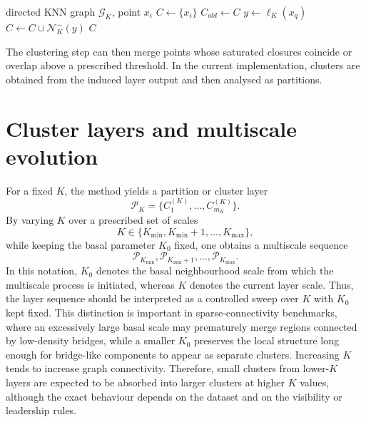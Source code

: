 \documentclass[pdflatex,sn-mathphys-num]{sn-jnl}
\newcommand{\calG}{\mathcal{G}}
\newcommand{\calN}{\mathcal{N}}
\newcommand{\calP}{\mathcal{P}}
\begin{document}
\begin{algorithm}[t]
\caption{Leadership-driven round-trip closure for one point}
\label{alg:closure}
\begin{algorithmic}[1]
\Require directed KNN graph $\calG_K$, point $x_i$
\State $C \gets \{x_i\}$
\Repeat
    \State $C_{old}\gets C$
        \State $y\gets \ell_K(x_q)$
        \State $C\gets C\cup\calN_K^-(y)$
    \EndFor
{}
\State \Return $C$
\end{algorithmic}
\end{algorithm}

The clustering step can then merge points whose saturated closures coincide or overlap above a prescribed threshold. In the current implementation, clusters are obtained from the induced layer output and then analysed as partitions.

\section{Cluster layers and multiscale evolution}\label{sec:layers}

For a fixed $K$, the method yields a partition or cluster layer
\begin{equation}
\calP_K=\{C_1^{(K)},\ldots,C_{m_K}^{(K)}\}.
\end{equation}
By varying $K$ over a prescribed set of scales
\begin{equation}
K\in\{K_{\min},K_{\min}+1,\ldots,K_{\max}\},
\end{equation}
while keeping the basal parameter $K_0$ fixed, one obtains a multiscale sequence
\begin{equation}
\calP_{K_{\min}},\calP_{K_{\min}+1},\ldots,\calP_{K_{\max}}.
\end{equation}
In this notation, $K_0$ denotes the basal neighbourhood scale from which the multiscale process is initiated, whereas $K$ denotes the current layer scale. Thus, the layer sequence should be interpreted as a controlled sweep over $K$ with $K_0$ kept fixed. This distinction is important in sparse-connectivity benchmarks, where an excessively large basal scale may prematurely merge regions connected by low-density bridges, while a smaller $K_0$ preserves the local structure long enough for bridge-like components to appear as separate clusters.
Increasing $K$ tends to increase graph connectivity. Therefore, small clusters from lower-$K$ layers are expected to be absorbed into larger clusters at higher $K$ values, although the exact behaviour depends on the dataset and on the visibility or leadership rules.
\end{document}
